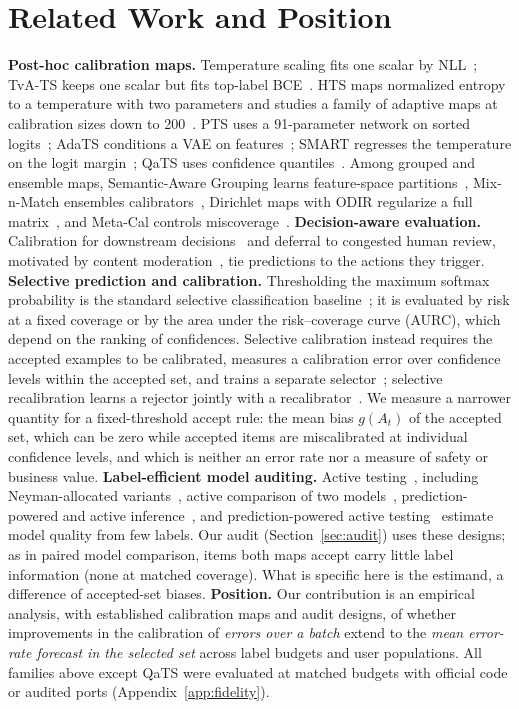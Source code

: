 \documentclass[sigconf,anonymous,review]{acmart}
\begin{document}
\section{Related Work and Position}
\label{sec:related}
\textbf{Post-hoc calibration maps.} Temperature scaling fits
one scalar by NLL~\cite{guo2017calibration}; TvA-TS keeps one scalar but
fits top-label BCE~\cite{lecoz2024tva}. HTS maps normalized entropy to a
temperature with two parameters and studies a family of adaptive maps at
calibration sizes down to 200~\cite{balanya2024adaptive}. PTS uses a
91-parameter network on sorted logits~\cite{tomani2022pts}; AdaTS
conditions a VAE on features~\cite{joy2023sample}; SMART regresses the
temperature on the logit margin~\cite{guo2026smart}; QaTS uses confidence
quantiles~\cite{chakraborty2026qats}. Among grouped and ensemble maps,
Semantic-Aware Grouping learns feature-space
partitions~\cite{yang2023semantic}, Mix-n-Match ensembles
calibrators~\cite{zhang2020mixnmatch}, Dirichlet maps with ODIR regularize
a full matrix~\cite{kull2019dirichlet}, and Meta-Cal controls
miscoverage~\cite{ma2021metacal}. \textbf{Decision-aware evaluation.} Calibration
for downstream decisions~\cite{zhao2021decision} and deferral to congested
human review, motivated by content moderation~\cite{lykouris2024defer},
tie predictions to the actions they trigger. \textbf{Selective prediction and calibration.}
Thresholding the maximum softmax probability is the standard selective
classification baseline~\cite{geifman2017selective}; it is evaluated by risk at a fixed coverage or by the area under the risk--coverage curve (AURC), which depend on the
ranking of confidences. Selective calibration instead requires the accepted
examples to be calibrated, measures a calibration error over confidence
levels within the accepted set, and trains a separate
selector~\cite{fisch2022selective}; selective recalibration learns a
rejector jointly with a recalibrator~\cite{zollo2024selective}. We measure a narrower quantity for a
fixed-threshold accept rule: the mean bias $g(A_t)$ of the accepted set,
which can be zero while accepted items are miscalibrated at individual
confidence levels, and which is neither an error rate nor a measure of
safety or business value. \textbf{Label-efficient model auditing.} Active
testing~\cite{kossen2021active}, including Neyman-allocated
variants~\cite{liu2026neyman}, active comparison of two
models~\cite{sawade2012active}, prediction-powered and active
inference~\cite{angelopoulos2023ppi,zrnic2024active}, and
prediction-powered active testing~\cite{ashouritaklimi2026ppat} estimate model
quality from few labels. Our audit (Section~\ref{sec:audit}) uses these designs; as in paired
model comparison, items both maps accept carry little label information
(none at matched coverage). What is specific here is the estimand, a
difference of accepted-set biases. \textbf{Position.}
Our contribution is an empirical analysis, with established calibration
maps and audit designs, of whether improvements in the calibration of
\emph{errors over a batch} extend to the \emph{mean error-rate forecast in
the selected set} across label budgets and user populations. All families above except QaTS were evaluated at matched budgets
with official code or audited ports (Appendix~\ref{app:fidelity}).
\end{document}

